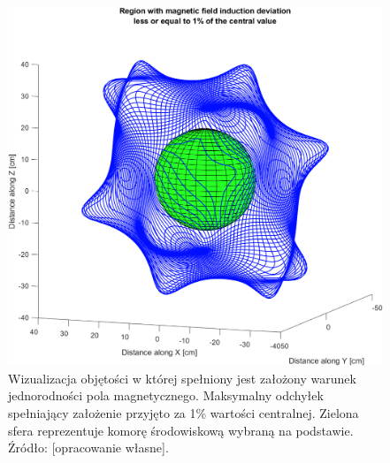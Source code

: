                                 
  \begin{figure}[t]
         	\centering
         	\includegraphics[scale=0.22]{pole_mag}
         	\caption{Wizualizacja objętości w której spełniony jest założony warunek jednorodności pola magnetycznego. Maksymalny odchyłek spełniający założenie przyjęto za 1\% wartości centralnej. Zielona sfera reprezentuje komorę środowiskową wybraną na podstawie. Źródło: [opracowanie własne].} 
         	\label{fig:polemag}
  \end{figure}
  


